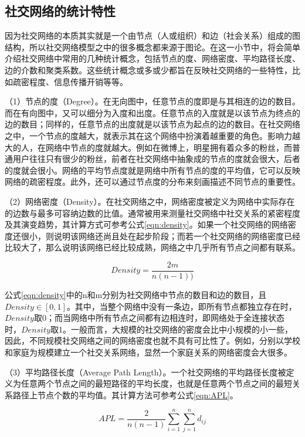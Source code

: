 \subsection{社交网络的统计特性}
因为社交网络的本质其实就是一个由节点（人或组织）和边（社会关系）组成的图结构，所以社交网络模型之中的很多概念都来源于图论。在这一小节中，将会简单介绍社交网络中常用的几种统计概念，包括节点的度、网络密度、平均路径长度、边的介数和聚类系数。这些统计概念或多或少都旨在反映社交网络的一些特性，比如疏密程度、信息传播开销等等。

（1）节点的度（Degree）。在无向图中，任意节点的度即是与其相连的边的数目。而在有向图中，又可以细分为入度和出度。任意节点的入度就是以该节点为终点的边的数目；同样的，任意节点的出度就是以该节点为起点的边的数目。在社交网络之中，一个节点的度越大，就表示其在这个网络中扮演着越重要的角色。影响力越大的人，在网络中节点的度就越大。例如在微博上，明星拥有着众多的粉丝，而普通用户往往只有很少的粉丝，前者在社交网络中抽象成的节点的度就会很大，后者的度就会很小。网络的平均节点度就是网络中所有节点的度的平均值，它可以反映网络的疏密程度。此外，还可以通过节点度的分布来刻画描述不同节点的重要性。

（2）网络密度（Density）。在社交网络之中，网络密度被定义为网络中实际存在的边数与最多可容纳边数的比值。通常被用来测量社交网络中社交关系的紧密程度及其演变趋势，其计算方式可参考公式\ref{eqn:density}。如果一个社交网络的网络密度还很小，则说明该网络还尚且处在起步阶段；而若一个社交网络的网络密度已经比较大了，那么说明该网络已经比较成熟，网络之中几乎所有节点之间都有联系。

\begin{equation}
  \label{eqn:density}
  Density=\frac{2m}{n(n-1))} 
\end{equation}

公式\ref{eqn:density}中的n和m分别为社交网络中节点的数目和边的数目，且$Density\in [0,1]$。其中，当整个网络中没有一条边，即所有节点都独立存在时，$Density$取0；而当网络中所有节点之间都有边相连时，即网络处于全连接状态时，$Density$取1。一般而言，大规模的社交网络的密度会比中小规模的小一些，因此，不同规模社交网络之间的网络密度也就不具有可比性了。例如，分别以学校和家庭为规模建立一个社交关系网络，显然一个家庭关系的网络密度会大很多。

（3）平均路径长度（Average Path Length）。一个社交网络的平均路径长度被定义为任意两个节点之间的最短路径的平均长度，也就是任意两个节点之间的最短关系路径上节点个数的平均值。其计算方法可参考公式\ref{eqn:APL}。

\begin{equation}
  \label{eqn:APL}
  APL=\frac{2}{n(n-1)}\sum _{i=1}^{n}\sum_{j=1}^{n}d_{ij}
\end{equation}

